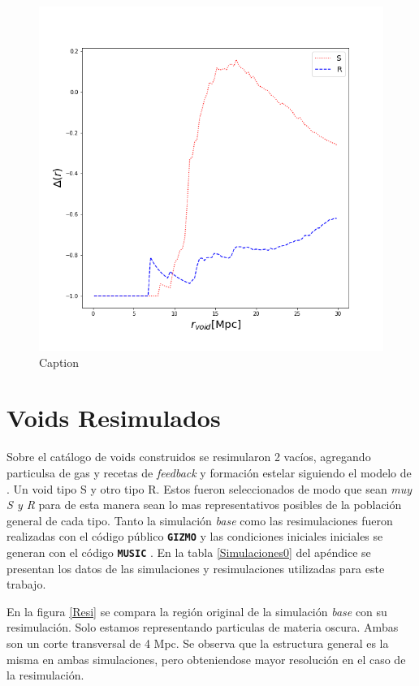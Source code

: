 \begin{figure}
    \centering
    \includegraphics[width=\linewidth]{Figures/perfiles_halos.png}
    \caption{Caption}
    \label{perfileshalos}
\end{figure}{}

\section{Voids Resimulados}

Sobre el cat\'alogo de voids construidos se resimularon 2 vac\'ios, agregando particulsa de gas y recetas de \textit{feedback} y formaci\'on estelar siguiendo el modelo de \citet{Springel2003}. Un void tipo S y otro tipo R. Estos fueron seleccionados de modo que sean \textit{muy S y R} para de esta manera sean lo mas representativos posibles de la poblaci\'on general de cada tipo. Tanto la simulaci\'on \textit{base} como las resimulaciones fueron realizadas con el c\'odigo p\'ublico \texttt{\textbf{GIZMO}} \citep{GIZMO2015} y las condiciones iniciales iniciales se generan con el c\'odigo \texttt{\textbf{MUSIC}} \citep{MUSIC}. En la tabla \ref{Simulaciones0} del ap\'endice se presentan los datos de las simulaciones y resimulaciones utilizadas para este trabajo. 

En la figura \ref{Resi} se compara la regi\'on original de la simulaci\'on \textit{base} con su resimulaci\'on. Solo estamos representando particulas de materia oscura. Ambas son un corte transversal de 4 Mpc. Se observa que la estructura general es la misma en ambas simulaciones, pero obteniendose mayor resoluci\'on en el caso de la resimulaci\'on. 

